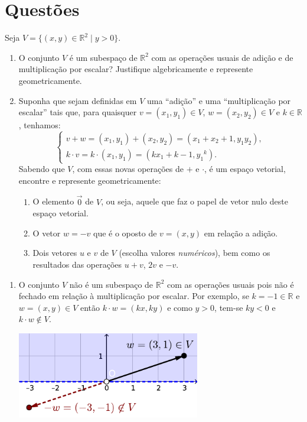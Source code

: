 \documentclass[12pt,a4paper]{article}
\newcommand*\R{\mathbb{R}}
\begin{document}
\section*{Questões}
\begin{ExerciseList}
\Exercise[title={2,5}]
Seja $V = \{ (x, y) \in \R^2 \mid y >0 \}$.
\begin{enumerate}
\item O conjunto $V$ é um subespaço de $\R^2$ com as operações usuais de adição e de multiplicação por escalar? Justifique algebricamente e represente geometricamente.
\item Suponha que sejam definidas em $V$ uma ``adição'' e uma ``multiplicação por escalar'' tais que, para quaisquer $v = (x_1, y_1) \in V$, $w = (x_2, y_2) \in V$ e $k \in \R$, tenhamos:
\[
\begin{cases}
    v + w = (x_1, y_1) + (x_2, y_2) = (x_1 + x_2+1, y_1 y_2),\\
k \cdot v = k \cdot (x_1, y_1) = (kx_1+k-1, {y_1}^k).
\end{cases}
\]
Sabendo que $V$, com essas novas operações de $+$ e $\cdot$, é um espaço vetorial, encontre e represente geometricamente:
\begin{enumerate}
\item O elemento $\vec{0}$ de $V$, ou seja, aquele que faz o papel de vetor nulo deste espaço vetorial.
\item O vetor $w = -v$ que é o oposto de $v = (x,y)$ em relação a adição.
\item Dois vetores $u$ e $v$ de $V$ (escolha valores \textit{numéricos}), bem como os resultados das operações $u+v$, $2v$ e $-v$.
\end{enumerate}
\end{enumerate}
\Answer
\begin{enumerate}
\item O conjunto $V$ não é um subespaço de $\R^2$ com as operações usuais pois não é fechado em relação à multiplicação por escalar. Por exemplo, se $k = -1 \in \R$ e $w = (x,y) \in V$ então $k \cdot w = (kx,ky)$ e como $y>0$, tem-se $ky<0$ e $k \cdot w \not\in V$.
\begin{center}
\includegraphics[width=8cm]{img/prova-2-pro-1a-exemplo-negativo}

\end{center}
\end{enumerate}
\end{ExerciseList}
\end{document}
